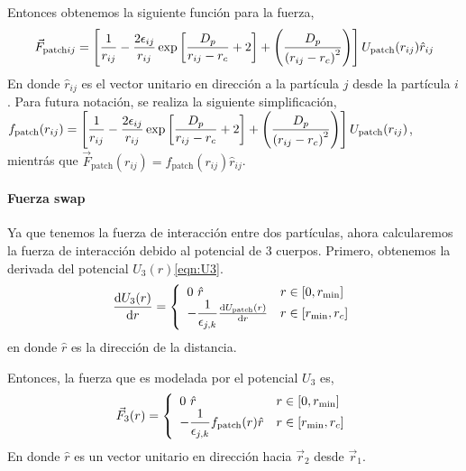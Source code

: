 \documentclass[../main.tex]{subfiles}
\begin{document}
Entonces obtenemos la siguiente función para la fuerza,
\begin{align*}
    \vec{F}_{\mathrm{patch}ij} = \left[
    \dfrac{1}{r_{ij}}-\dfrac{2\epsilon_{ij}}{r_{ij}}\exp\left[\dfrac{D_{p}}{r_{ij}-r_{c}}+2\right]
    +
\left(\dfrac{D_{p}}{\qty(r_{ij}-r_{c})^{2}}\right)\right]U_{\mathrm{patch}}(r_{ij})\hat{r}_{ij}\label{eqn:Fpatch} 
\end{align*}
En donde \(\hat{r}_{ij}\) es el vector unitario en dirección a la partícula $j$ desde la partícula $i$.
Para futura notación, se realiza la siguiente simplificación, \(f_{\mathrm{patch}}(r_{ij}) = \left[
    \dfrac{1}{r_{ij}}-\dfrac{2\epsilon_{ij}}{r_{ij}}\exp\left[\dfrac{D_{p}}{r_{ij}-r_{c}}+2\right]
    + 
\left(\dfrac{D_{p}}{\qty(r_{ij}-r_{c})^{2}}\right)\right]U_{\mathrm{patch}}(r_{ij})\),
mientrás que \(\vec{F}_{\mathrm{patch}}(r_{ij}) = f_{\mathrm{patch}}(r_{ij})\hat{r}_{ij}\).

\paragraph{Fuerza swap} Ya que tenemos la fuerza de interacción entre dos partículas, ahora calcularemos la fuerza de interacción debido al potencial de 3 cuerpos.
Primero, obtenemos la derivada del potencial \(U_3(r)\)\eqref{eqn:U3}.
\begin{gather*}
    \dv{U_{3}\qty(r)}{r} =
    \left\{
    \begin{array}{ll}
        0~\hat{r} & r\in\qty[0,r_{\min}] \\
        -\dfrac{1}{\epsilon_{j,k}}\dv{U_{\mathrm{patch}}(r)}{r} & r\in\qty[r_{\min},r_c]
    \end{array}
    \right.
\end{gather*}
en donde \(\hat{r}\) es la dirección de la distancia.

Entonces, la fuerza que es modelada por el potencial \(U_3\) es,
\begin{gather*}
    \vec{F}_{3}(r) =
    \left\{
    \begin{array}{ll}
        0~\hat{r} & r\in\qty[0,r_{\min}] \\
        -\dfrac{1}{\epsilon_{j,k}}f_{\mathrm{patch}}(r)\hat{r} & r\in\qty[r_{\min},r_c]
    \end{array}
    \right.
\end{gather*}
En donde \(\hat{r}\) es un vector unitario en dirección hacia \(\vec{r}_2\) desde \(\vec{r}_1\).
\end{document}
